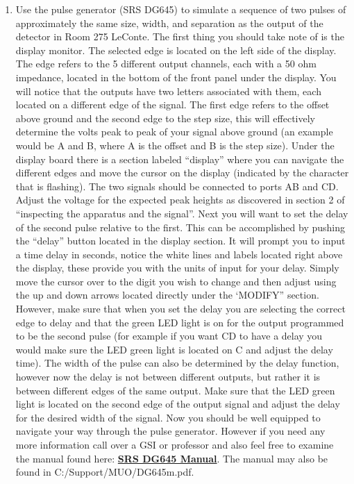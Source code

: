 \documentclass{../lab}
\begin{document}
\begin{enumerate}
    \item Use the pulse generator (SRS DG645) to simulate a sequence of two pulses of approximately the same size, width, and separation as the output of the detector in Room 275 LeConte. The first thing you should take note of is the display monitor. The selected edge is located on the left side of the display. The edge refers to the 5 different output channels, each with a 50 ohm impedance, located in the bottom of the front panel under the display. You will notice that the outputs have two letters associated with them, each located on a different edge of the signal. The first edge refers to the offset above ground and the second edge to the step size, this will effectively determine the volts peak to peak of your signal above ground (an example would be A and B, where A is the offset and B is the step size). Under the display board there is a section labeled ``display'' where you can navigate the different edges and move the cursor on the display (indicated by the character that is flashing). The two signals should be connected to ports AB and CD. Adjust the voltage for the expected peak heights as discovered in section 2 of ``inspecting the apparatus and the signal''. Next you will want to set the delay of the second pulse relative to the first. This can be accomplished by pushing the ``delay'' button located in the display section. It will prompt you to input a time delay in seconds, notice the white lines and labels located right above the display, these provide you with the units of input for your delay. Simply move the cursor over to the digit you wish to change and then adjust using the up and down arrows located directly under the ‘MODIFY” section. However, make sure that when you set the delay you are selecting the correct edge to delay and that the green LED light is on for the output programmed to be the second pulse (for example if you want CD to have a delay you would make sure the LED green light is located on C and adjust the delay time). The width of the pulse can also be determined by the delay function, however now the delay is not between different outputs, but rather it is between different edges of the same output. Make sure that the LED green light is located on the second edge of the output signal and adjust the delay for the desired width of the signal. Now you should be well equipped to navigate your way through the pulse generator. However if you need any more information call over a GSI or professor and also feel free to examine the manual found here: \href{http://experimentationlab.berkeley.edu/sites/default/files/DG645manual.pdf}{\textbf{SRS DG645 Manual}}. The manual may also be found in C:/Support/MUO/DG645m.pdf.
    

\end{enumerate}
\end{document}

